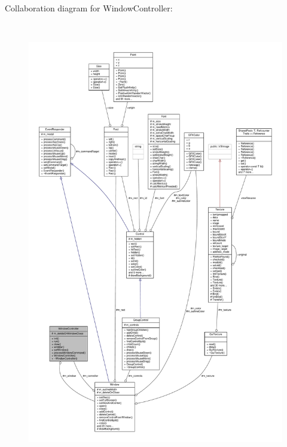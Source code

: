 Collaboration diagram for Window\+Controller\+:
\nopagebreak
\begin{figure}[H]
\begin{center}
\leavevmode
\includegraphics[height=550pt]{d2/ddc/classWindowController__coll__graph}
\end{center}
\end{figure}
